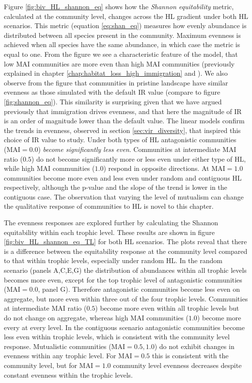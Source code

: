 Figure \ref{fig:biv_HL_shannon_eq} shows how the \emph{Shannon equitability} metric, calculated at the community level, changes across the HL gradient under both HL scenarios. This metric (equation \eqref{eq:shan_eq}) measures how evenly abundance is distributed between all species present in the community. Maximum evenness is achieved when all species have the same abundance, in which case the metric is equal to one. From the figure we see a characteristic feature of the model, that low MAI communities are more even than high MAI communities (previously explained in chapter \ref{chap:habitat_loss_high_immigration} and \cite{lurgi2015effects}). We also observe from the figure that communities in pristine landscape have similar evenness as those simulated with the default IR value (compare to figure \ref{fig:shannon_eq}). This similarity is surprising given that we have argued previously that immigration drives evenness, and that here the magnitude of IR is an order of magnitude lower than the default value. The linear models confirm the trends in evenness, observed in section \ref{sec:vir_diversity}, that inspired this choice of IR value to study. Under both types of HL antagonistic communities (MAI$=0.0$) \emph{become significantly less even}. Communities at intermediate MAI ratio ($0.5$) do not become significantly more or less even under either type of HL, while high MAI communities ($1.0$) respond in opposite directions. At MAI$=1.0$ communities become more even and less even under random and contiguous HL respectively, although the p-value and the slope of the trend is lower in the contiguous case. The observation that varying the level of mutualism can change the qualitative response of communities to HL is novel to this chapter.


The evenness responses are explored further by calculating the Shannon equitability within each trophic level. These results are shown in figure \ref{fig:biv_HL_shannon_eq_TL} for both HL scenarios. The plots reveal that there is a difference between the  equitability response at the community level compared to that within trophic levels, especially under random HL. In the random scenario (panels A,C,E,G) the distribution of abundances within all trophic levels becomes more even, except for the top trophic level of antagonistic communities (MAI$=0.0$, panel G). Therefore antagonistic communities become less even on aggregate, but more even within three out of the four trophic levels. Communities at intermediate MAI ratio ($0.5$) become more even within all trophic levels but do not change on aggregate, whereas high MAI communities ($1.0$) become more every at every level. In the contiguous scenario antagonistic communities  become less even within trophic levels, which is consistent with the community level response. Mutualistic communities (MAI$=0.5,1.0$) do not exhibit changes in evenness within any trophic level. For MAI$=0.5$ this is consistent with the community level, but for MAI$=1.0$ community level evenness decreases despite constant evenness within the trophic levels.   


